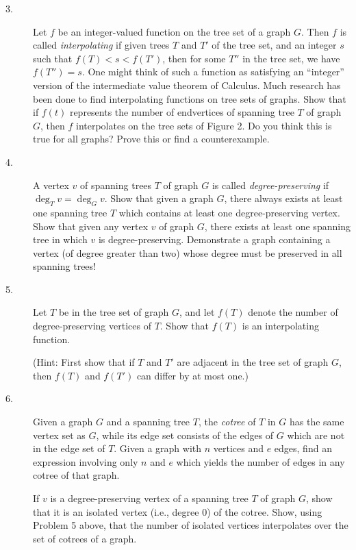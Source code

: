 \documentclass{article}
\begin{document}
\begin{description}
\item[3.] Let $f$ be an integer-valued function on the tree set of a graph $G$. Then $f$ is called \emph{interpolating} if given trees $T$ and $T'$ of the tree set, and an integer $s$ such that $f(T) < s < f(T')$, then for some $T''$ in the tree set, we have $f(T'') = s$. One might think of such a function as satisfying an ``integer'' version of the intermediate value theorem of Calculus. Much research has been done to find interpolating functions on tree sets of graphs. Show that if $f(t)$ represents the number of endvertices of spanning tree $T$ of graph $G$, then $f$ interpolates on the tree sets of Figure 2. Do you think this is true for all graphs? Prove this or find a counterexample.

\item[4.] A vertex $v$ of spanning trees $T$ of graph $G$ is called \emph{degree-preserving} if $\deg_Tv = \deg_Gv$. Show that given a graph $G$, there always exists at least one spanning tree $T$ which contains at least one degree-preserving vertex. Show that given any vertex $v$ of graph $G$, there exists at least one spanning tree in which $v$ is degree-preserving. Demonstrate a graph containing a vertex (of degree greater than two) whose degree must be preserved in all spanning trees!

\item[5.] Let $T$ be in the tree set of graph $G$, and let $f(T)$ denote the number of degree-preserving vertices of $T$. Show that $f(T)$ is an interpolating function.

  (Hint: First show that if $T$ and $T'$ are adjacent in the tree set of graph $G$, then $f(T)$ and $f(T')$ can differ by at most one.)

\item[6.] Given a graph $G$ and a spanning tree $T$, the \emph{cotree} of $T$ in $G$ has the same vertex set as $G$, while its edge set consists of the edges of $G$ which are not in the edge set of $T$. Given a graph with $n$ vertices and $e$ edges, find an expression involving only $n$ and $e$ which yields the number of edges in any cotree of that graph.

  If $v$ is a degree-preserving vertex of a spanning tree $T$ of graph $G$, show that it is an isolated vertex (i.e., degree $0$) of the cotree. Show, using Problem 5 above, that the number of isolated vertices interpolates over the set of cotrees of a graph.


\end{description}
\end{document}
